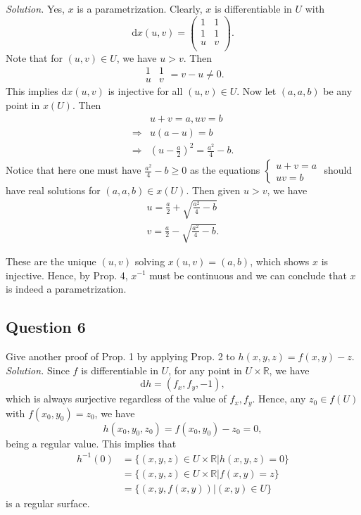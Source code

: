 \documentclass[12pt]{article}
\begin{document}
\textit{Solution.} Yes, $x$ is a parametrization. Clearly, $x$ is differentiable in $U$ with \begin{equation*}
    \mathrm dx(u,v) =\begin{pmatrix}
    1&1\\
    1&1\\
    u&v\\
    \end{pmatrix}.
\end{equation*}
Note that for $(u,v)\in U$, we have $u>v$. Then $$\begin{array}{|cc|}
     1&1  \\
     u&v
\end{array} = v - u \neq 0.$$
This implies $\mathrm dx(u,v)$ is injective for all $(u,v)\in U$. Now let $(a,a,b)$ be any point in $x(U)$. Then \begin{align*}
    &u+v=a,uv=b\\
    \Rightarrow &u(a-u)=b\\
    \Rightarrow &(u-\frac{a}{2})^2 = \frac{a^2}{4}-b.
\end{align*}
Notice that here one must have $\frac{a^2}{4}-b \geq 0$ as the equations $\begin{cases} u+v=a\\
uv=b
\end{cases}$ should have real solutions for $(a,a,b)\in x(U)$. Then given $u>v$, we have \begin{align*}
    u = \frac{a}{2}+\sqrt{\frac{a^2}{4}-b}\\
    v = \frac{a}{2}-\sqrt{\frac{a^2}{4}-b}.
\end{align*}

These are the unique $(u,v)$ solving $x(u,v)=(a,b)$, which shows $x$ is injective. Hence, by Prop. 4,  $x^{-1}$ must be continuous and we can conclude that $x$ is indeed a parametrization.

\subsection*{Question 6}
Give another proof of Prop. 1 by applying Prop. 2 to $h(x,y,z)=f(x,y)-z$.\\

\textit{Solution.}
Since $f$ is differentiable in $U$, for any point in $U \times \mathbb{R}$, we have \begin{equation*}
    \mathrm dh = (f_x,f_y,-1),
\end{equation*}
which is always surjective regardless of the value of $f_x,f_y$. Hence, any $z_0 \in f(U)$ with $f(x_0,y_0) = z_0$, we have \begin{equation*}
    h(x_0,y_0,z_0) = f(x_0,y_0) - z_0 = 0,
\end{equation*}
being a regular value. This implies that \begin{align*}
    h^{-1}(0) &= \{(x,y,z)\in U\times \mathbb{R}|h(x,y,z)=0\}\\
    &=\{(x,y,z)\in U\times \mathbb{R}|f(x,y)=z\}\\
    &=\{(x,y,f(x,y))|(x,y)\in U\}
\end{align*}
is a regular surface.
\end{document}
